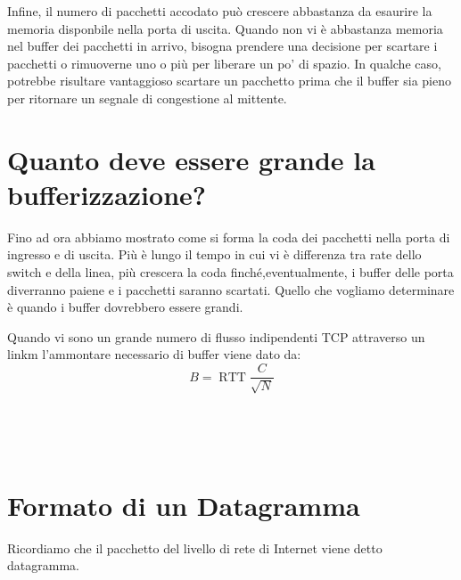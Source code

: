 \documentclass{book}
\newcommand{\tmop}[1]{\ensuremath{\operatorname{#1}}}
\begin{document}
Infine, il numero di pacchetti accodato pu{\`o} crescere abbastanza da
esaurire la memoria disponbile nella porta di uscita. Quando non vi {\`e}
abbastanza memoria nel buffer dei pacchetti in arrivo, bisogna prendere una
decisione per scartare i pacchetti o rimuoverne uno o pi{\`u} per liberare un
po' di spazio. In qualche caso, potrebbe risultare vantaggioso scartare un
pacchetto prima che il buffer sia pieno per ritornare un segnale di
congestione al mittente.

\section{Quanto deve essere grande la bufferizzazione?}

Fino ad ora abbiamo mostrato come si forma la coda dei pacchetti nella porta
di ingresso e di uscita. Pi{\`u} {\`e} lungo il tempo in cui vi {\`e}
differenza tra rate dello switch e della linea, pi{\`u} crescera la coda
finch{\'e},eventualmente, i buffer delle porta diverranno paiene e i pacchetti
saranno scartati. Quello che vogliamo determinare {\`e} quando i buffer
dovrebbero essere grandi.

Quando vi sono un grande numero di flusso indipendenti TCP attraverso un linkm
l'ammontare necessario di buffer viene dato da:
\[ B = \tmop{RTT} \frac{C}{\sqrt{N}} \]


\

\

\section{Formato di un Datagramma}

Ricordiamo che il pacchetto del livello di rete di Internet viene detto
datagramma.

{}
\end{document}
